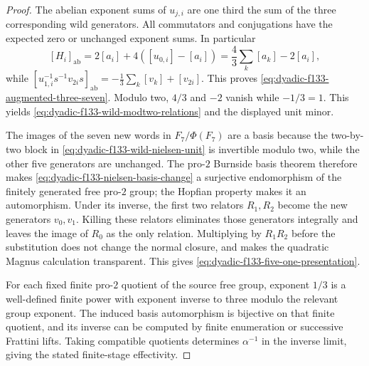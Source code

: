 \documentclass[11pt]{article}
\theoremstyle{definition}
\begin{document}
\begin{proof}
The abelian
exponent sums
of $u_{j,i}$
are one third
the sum of
the three
corresponding
wild generators.
All commutators
and conjugations
have the expected
zero or unchanged
exponent sums.
In particular
\[
[H_i]_{\mathrm{ab}}
=2[a_i]+4([u_{0,i}]-[a_i])
=\frac43\sum_k[a_k]-2[a_i],
\]
while
$[u_{1,i}^{-1}
s^{-1}v_{2i}s]_{\mathrm{ab}}
=-\frac13\sum_k[v_k]+[v_{2i}]$.
This proves
\eqref{eq:dyadic-f133-augmented-three-seven}.
Modulo two,
$4/3$ and $-2$
vanish while
$-1/3=1$.
This yields
\eqref{eq:dyadic-f133-wild-modtwo-relations}
and the displayed
unit minor.

The images of
the seven new
words in
$F_7/\Phi(F_7)$
are a basis
because the
two-by-two
block in
\eqref{eq:dyadic-f133-wild-nielsen-unit}
is invertible
modulo two,
while the
other five
generators are
unchanged.
The pro-$2$
Burnside basis
theorem therefore
makes
\eqref{eq:dyadic-f133-nielsen-basis-change}
a surjective
endomorphism
of the finitely
generated free
pro-$2$ group;
the Hopfian
property makes
it an automorphism.
Under its inverse,
the first two
relators $R_1,R_2$
become the new
generators
$v_0,v_1$.
Killing these
relators eliminates
those generators
integrally and
leaves the image
of $R_0$ as
the only relation.
Multiplying by
$R_1R_2$ before
the substitution
does not change
the normal
closure, and
makes the
quadratic Magnus
calculation
transparent.
This gives
\eqref{eq:dyadic-f133-five-one-presentation}.

For each fixed
finite pro-$2$
quotient of
the source free
group, exponent
$1/3$ is a
well-defined
finite power
with exponent
inverse to three
modulo the
relevant group
exponent.
The induced
basis automorphism
is bijective
on that finite
quotient, and
its inverse
can be computed
by finite
enumeration or
successive
Frattini lifts.
Taking compatible
quotients
determines
$\alpha^{-1}$
in the inverse
limit, giving
the stated
finite-stage
effectivity.
\end{proof}
\end{document}
